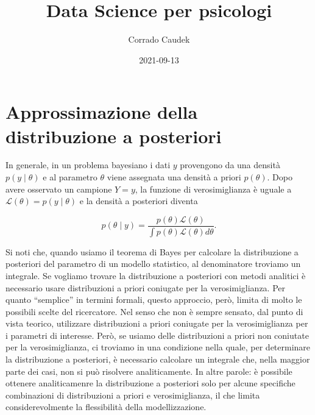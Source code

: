 \documentclass[
]{memoir}
\title{Data Science per psicologi}
\author{Corrado Caudek}
\date{2021-09-13}
\begin{document}
\maketitle

{
\hypersetup{linkcolor=}
\setcounter{tocdepth}{1}
\tableofcontents
}
\newpage

\vspace*{5cm}

\thispagestyle{empty}

\hypertarget{approssimazione-della-distribuzione-a-posteriori}{%
\chapter{Approssimazione della distribuzione a posteriori}\label{approssimazione-della-distribuzione-a-posteriori}}

In generale, in un problema bayesiano i dati \(y\) provengono da una densità \(p(y \mid \theta)\) e al parametro \(\theta\) viene assegnata una densità a priori \(p(\theta)\). Dopo avere osservato un campione \(Y = y\), la funzione di verosimiglianza è uguale a \(\mathcal{L}(\theta) = p(y \mid \theta)\) e la densità a posteriori diventa

\begin{equation}
p(\theta \mid y) = \frac{p(\theta) \mathcal{L}(\theta)}{\int p(\theta) \mathcal{L}(\theta) d \theta}.
\end{equation}

Si noti che, quando usiamo il teorema di Bayes per calcolare la distribuzione a posteriori del parametro di un modello statistico, al denominatore troviamo un integrale. Se vogliamo trovare la distribuzione a posteriori con metodi analitici è necessario usare distribuzioni a priori coniugate per la verosimiglianza.
Per quanto ``semplice'' in termini formali, questo approccio, però, limita di molto le possibili scelte del ricercatore. Nel senso che non è sempre sensato, dal punto di vista teorico, utilizzare distribuzioni a priori coniugate per la verosimiglianza per i parametri di interesse. Però, se usiamo delle distribuzioni a priori non coniutate per la verosimiglianza, ci troviamo in una condizione nella quale, per determinare la distribuzione a posteriori, è necessario calcolare un integrale che, nella maggior parte dei casi, non si può risolvere analiticamente. In altre parole: è possibile ottenere analiticamenre la distribuzione a posteriori solo per alcune specifiche combinazioni di distribuzioni a priori e verosimiglianza, il che limita considerevolmente la flessibilità della modellizzazione.
\end{document}
